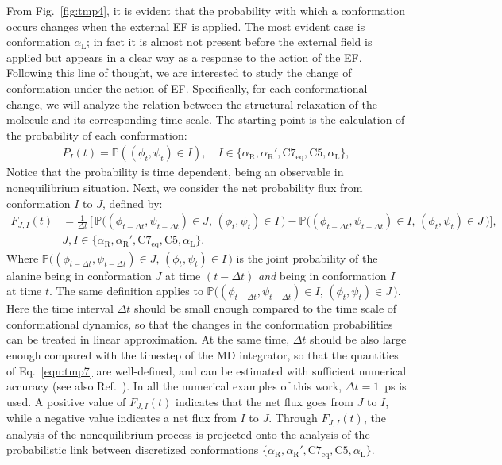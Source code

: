 \documentclass[a4paper,preprint,unsortedaddress,onecolumn]{revtex4-1}
\newcommand{\recheck}[1]{{\color{red} #1}}
\newcommand{\confaa}[0]{{\alpha_{\textrm{R}}}}
\newcommand{\confab}[0]{{\alpha_{\textrm{R}}'}}
\newcommand{\confba}[0]{{\textrm{C}7_{\textrm{eq}}}}
\newcommand{\confbb}[0]{{\textrm{C}5}}
\newcommand{\confc}[0]{{\alpha_{\textrm{L}}}}
\begin{document}
From Fig.~\ref{fig:tmp4}, it is evident that the probability with which a
conformation occurs changes when the external EF is applied.
The most evident case is conformation $\confc$; in fact it is {almost} not present before the external field is applied but appears in a clear way as a response to the action of the EF. Following this line of thought, we are interested to study the change of conformation under the action of EF. Specifically, for each conformational change, we will analyze the relation between the structural relaxation of the molecule and its corresponding time scale. 
The starting point is the calculation of the probability
of each conformation:
\begin{align}
  P_I(t) = \mathbb P ( (\phi_t,\psi_t) \in I), \quad  I \in \{\confaa, \confab, \confba, \confbb, \confc\},
\end{align}
Notice that the probability is time dependent, being an observable in nonequilibrium situation.
Next,
we consider the net probability flux from conformation $I$ to $J$, defined by:
\begin{align}\nonumber
  F_{J,I}(t) & = \frac1{\Delta t}\,
  \bigg[\,
  \mathbb P \big( (\phi_{t-\Delta t},\psi_{t-\Delta t}) \in J,\, (\phi_t, \psi_t) \in I \,\big) 
  -
  \mathbb P \big( (\phi_{t-\Delta t}, \psi_{t-\Delta t}) \in I,\, (\phi_t, \psi_t) \in J \,\big)
  \bigg], \\\label{eqn:tmp7}
  & J,I \in \{\confaa, \confab, \confba, \confbb, \confc\}.
\end{align}
Where $\mathbb P\big( (\phi_{t-\Delta t}, \psi_{t-\Delta t}) \in J,\, (\phi_t, \psi_t) \in I\,\big)$
is the joint probability of the alanine being in conformation $J$ at
time $(t-\Delta t)$ \emph{and} being in conformation $I$ at time $t$.
The same definition applies to
$\mathbb P \big( (\phi_{t-\Delta t}, \psi_{t-\Delta t}) \in I,\, (\phi_t, \psi_t) \in J\,\big)$.
Here the time interval $\Delta t$ should be small enough compared to the
time scale of conformational dynamics,
so that the changes in the conformation probabilities
can be treated in linear approximation.
At the same time,  $\Delta t$ should be also large enough compared with
the timestep of the MD integrator, 
so that the quantities of Eq.~\eqref{eqn:tmp7} are well-defined, and can be
estimated with sufficient numerical accuracy (see also Ref.~\cite{schuette2011markov}).
\recheck{In all the numerical examples of this work, $\Delta t = 1$~ps is used}.
A positive value of $F_{J,I}(t)$ indicates that the
net flux goes from $J$ to $I$,
while a negative value indicates a net flux from $I$ to $J$.
Through $F_{J,I}(t)$, the analysis of the nonequilibrium process 
is projected onto the analysis of the probabilistic link between discretized conformations $\{\confaa, \confab, \confba, \confbb, \confc\}$.
\end{document}
